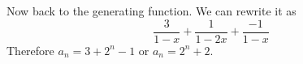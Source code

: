 \documentclass[11pt]{exam}
\begin{document}
\begin{questions}
\begin{solution}
  Now back to the generating function.  We can rewrite it as 
  \[\frac{3}{1-x} + \frac{1}{1-2x} + \frac{-1}{1-x}\]
  Therefore $a_n = 3 + 2^n - 1$ or $a_n = 2^n + 2$.
\end{solution}

\end{questions}
\end{document}
